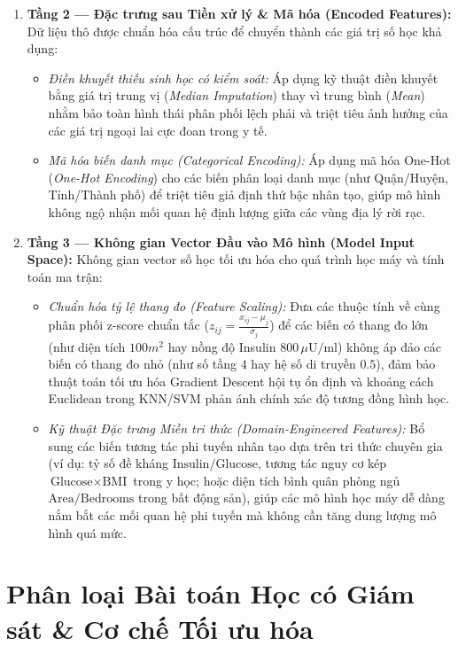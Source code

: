 \documentclass[12pt,a4paper]{report}
\begin{document}
\begin{enumerate}[leftmargin=1.5em]
    \item \textbf{Tầng 2 — Đặc trưng sau Tiền xử lý \& Mã hóa (Encoded Features):} 
    Dữ liệu thô được chuẩn hóa cấu trúc để chuyển thành các giá trị số học khả dụng:
    \begin{itemize}[leftmargin=1.2em]
        \item \textit{Điền khuyết thiếu sinh học có kiểm soát:} Áp dụng kỹ thuật điền khuyết bằng giá trị trung vị (\textit{Median Imputation}) thay vì trung bình (\textit{Mean}) nhằm bảo toàn hình thái phân phối lệch phải và triệt tiêu ảnh hưởng của các giá trị ngoại lai cực đoan trong y tế.
        \item \textit{Mã hóa biến danh mục (Categorical Encoding):} Áp dụng mã hóa One-Hot (\textit{One-Hot Encoding}) cho các biến phân loại danh mục (như Quận/Huyện, Tỉnh/Thành phố) để triệt tiêu giả định thứ bậc nhân tạo, giúp mô hình không ngộ nhận mối quan hệ định lượng giữa các vùng địa lý rời rạc.
    \end{itemize}

    \item \textbf{Tầng 3 — Không gian Vector Đầu vào Mô hình (Model Input Space):} 
    Không gian vector số học tối ưu hóa cho quá trình học máy và tính toán ma trận:
    \begin{itemize}[leftmargin=1.2em]
        \item \textit{Chuẩn hóa tỷ lệ thang đo (Feature Scaling):} Đưa các thuộc tính về cùng phân phối z-score chuẩn tắc ($z_{ij} = \frac{x_{ij} - \mu_j}{\sigma_j}$) để các biến có thang đo lớn (như diện tích $100m^2$ hay nồng độ Insulin $800\,\mu\text{U/ml}$) không áp đảo các biến có thang đo nhỏ (như số tầng $4$ hay hệ số di truyền $0.5$), đảm bảo thuật toán tối ưu hóa Gradient Descent hội tụ ổn định và khoảng cách Euclidean trong KNN/SVM phản ánh chính xác độ tương đồng hình học.
        \item \textit{Kỹ thuật Đặc trưng Miền tri thức (Domain-Engineered Features):} Bổ sung các biến tương tác phi tuyến nhân tạo dựa trên tri thức chuyên gia (ví dụ: tỷ số đề kháng $\text{Insulin}/\text{Glucose}$, tương tác nguy cơ kép $\text{Glucose} \times \text{BMI}$ trong y học; hoặc diện tích bình quân phòng ngủ $\text{Area}/\text{Bedrooms}$ trong bất động sản), giúp các mô hình học máy dễ dàng nắm bắt các mối quan hệ phi tuyến mà không cần tăng dung lượng mô hình quá mức.
    \end{itemize}
\end{enumerate}

\section{Phân loại Bài toán Học có Giám sát \& Cơ chế Tối ưu hóa}
\end{document}
